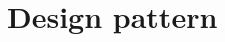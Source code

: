 \documentclass[../SpecificaTecnica.tex]{subfiles}
\begin{document}
\section{Design pattern}
	
\end{document}
